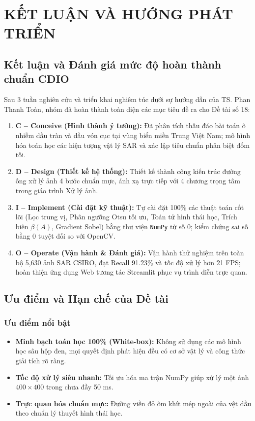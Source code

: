\chapter{KẾT LUẬN VÀ HƯỚNG PHÁT TRIỂN}
\label{ch:conclusion}

\section{Kết luận và Đánh giá mức độ hoàn thành chuẩn CDIO}
\label{sec:cdio_evaluation}
Sau 3 tuần nghiên cứu và triển khai nghiêm túc dưới sự hướng dẫn của TS. Phan Thanh Toàn, nhóm đã hoàn thành toàn diện các mục tiêu đề ra cho Đề tài số 18:
\begin{enumerate}
    \item \textbf{C -- Conceive (Hình thành ý tưởng):} Đã phân tích thấu đáo bài toán ô nhiễm dầu tràn và dầu vón cục tại vùng biển miền Trung Việt Nam; mô hình hóa toán học các hiện tượng vật lý SAR và xác lập tiêu chuẩn phân biệt đốm tối.
    \item \textbf{D -- Design (Thiết kế hệ thống):} Thiết kế thành công kiến trúc đường ống xử lý ảnh 4 bước chuẩn mực, ánh xạ trực tiếp với 4 chương trọng tâm trong giáo trình Xử lý ảnh.
    \item \textbf{I -- Implement (Cài đặt kỹ thuật):} Tự cài đặt 100\% các thuật toán cốt lõi (Lọc trung vị, Phân ngưỡng Otsu tối ưu, Toán tử hình thái học, Trích biên $\beta(A)$, Gradient Sobel) bằng thư viện \texttt{NumPy} từ số 0; kiểm chứng sai số bằng 0 tuyệt đối so với OpenCV.
    \item \textbf{O -- Operate (Vận hành & Đánh giá):} Vận hành thử nghiệm trên toàn bộ 5,630 ảnh SAR CSIRO, đạt Recall 91.23\% và tốc độ xử lý hơn 21 FPS; hoàn thiện ứng dụng Web tương tác Streamlit phục vụ trình diễn trực quan.
\end{enumerate}

\section{Ưu điểm và Hạn chế của Đề tài}
\label{sec:pros_cons}

\subsection{Ưu điểm nổi bật}
\begin{itemize}
    \item \textbf{Minh bạch toán học 100\% (White-box):} Không sử dụng các mô hình học sâu hộp đen, mọi quyết định phát hiện đều có cơ sở vật lý và công thức giải tích rõ ràng.
    \item \textbf{Tốc độ xử lý siêu nhanh:} Tối ưu hóa ma trận NumPy giúp xử lý một ảnh $400 \times 400$ trong chưa đầy 50 ms.
    \item \textbf{Trực quan hóa chuẩn mực:} Đường viền đỏ ôm khít mép ngoài của vệt dầu theo chuẩn lý thuyết hình thái học.
\end{itemize}

